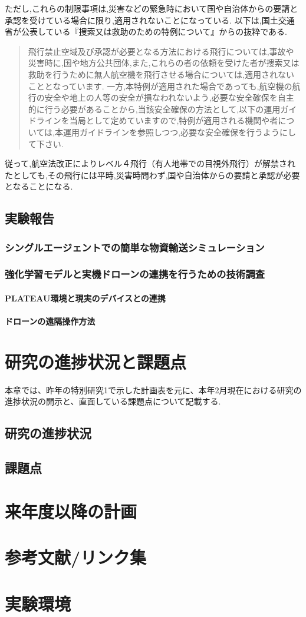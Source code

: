 \documentclass{article}[jsarticle]
\begin{document}
ただし,これらの制限事項は,災害などの緊急時において国や自治体からの要請と承認を受けている場合に限り,適用されないことになっている.
以下は,国土交通省が公表している『捜索又は救助のための特例について』からの抜粋である.
\begin{quote}
    飛行禁止空域及び承認が必要となる方法における飛行については,事故や災害時に,国や地方公共団体,また,これらの者の依頼を受けた者が捜索又は救助を行うために無人航空機を飛行させる場合については,適用されないこととなっています.
    一方,本特例が適用された場合であっても,航空機の航行の安全や地上の人等の安全が損なわれないよう,必要な安全確保を自主的に行う必要があることから,当該安全確保の方法として,以下の運用ガイドラインを当局として定めていますので,特例が適用される機関や者については,本運用ガイドラインを参照しつつ,必要な安全確保を行うようにして下さい.
\end{quote}
従って,航空法改正によりレベル４飛行（有人地帯での目視外飛行）が解禁されたとしても,その飛行には平時,災害時問わず,国や自治体からの要請と承認が必要となることになる.

\subsection{実験報告}
\subsubsection{シングルエージェントでの簡単な物資輸送シミュレーション}
\subsubsection{強化学習モデルと実機ドローンの連携を行うための技術調査}
\paragraph{PLATEAU環境と現実のデバイスとの連携}
\paragraph{ドローンの遠隔操作方法}


\section{研究の進捗状況と課題点}
本章では、昨年の特別研究1で示した計画表を元に、本年2月現在における研究の進捗状況の開示と、直面している課題点について記載する.
\subsection{研究の進捗状況}
\subsection{課題点}
\section{来年度以降の計画}

\section{参考文献/リンク集}

\section{実験環境}
\end{document}
